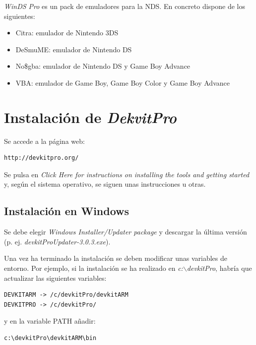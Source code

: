 \textit{WinDS Pro} es un pack de emuladores para la NDS. En concreto dispone de los siguientes:
\begin{itemize}
\item Citra: emulador de Nintendo 3DS
\item DeSmuME: emulador de Nintendo DS
\item No\$gba: emulador de Nintendo DS y Game Boy Advance
\item VBA: emulador de Game Boy, Game Boy Color y Game Boy Advance
\end{itemize}

\section{Instalación de \textit{DekvitPro}}
Se accede a la página web:
\begin{verbatim}
http://devkitpro.org/
\end{verbatim}

Se pulsa en \textit{Click Here for instructions on installing the tools and getting started} y, según el sistema operativo, se siguen unas instrucciones u otras.

\subsection{Instalación en Windows}
Se debe elegir \textit{Windows Installer/Updater package} y descargar la última versión (p. ej. \textit{devkitProUpdater-3.0.3.exe}). 

Una vez ha terminado la instalación se deben modificar unas variables de entorno. Por ejemplo, si la instalación se ha realizado en \textit{c:$\backslash$devkitPro}, habría que actualizar las siguientes variables:
\begin{verbatim}
DEVKITARM -> /c/devkitPro/devkitARM
DEVKITPRO -> /c/devkitPro/
\end{verbatim}

y en la variable PATH añadir:
\begin{verbatim}
c:\devkitPro\devkitARM\bin
\end{verbatim}

